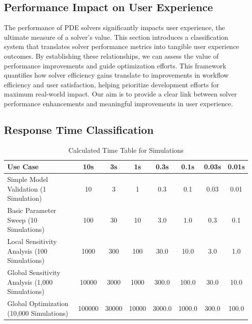 \documentclass{article}
\begin{document}
\begin{landscape}

\section{Performance Impact on User Experience}


The performance of PDE solvers significantly impacts user experience, the ultimate measure of a solver's value. This section introduces a classification system that translates solver performance metrics into tangible user experience outcomes. By establishing these relationships, we can assess the value of performance improvements and guide optimization efforts. This framework quantifies how solver efficiency gains translate to improvements in workflow efficiency and user satisfaction, helping prioritize development efforts for maximum real-world impact. Our aim is to provide a clear link between solver performance enhancements and meaningful improvements in user experience.

\subsection{Response Time Classification}

\begin{table}[h!]
    \centering
    \begin{tabular}{|l|c|c|c|c|c|c|c|}
    \hline
    \textbf{Use Case} & \textbf{10s} & \textbf{3s} & \textbf{1s} & \textbf{0.3s} & \textbf{0.1s} & \textbf{0.03s} & \textbf{0.01s} \\ \hline
    Simple Model Validation (1 Simulation) & 10 & 3 & 1 & 0.3 & 0.1 & 0.03 & 0.01 \\ \hline
    Basic Parameter Sweep (10 Simulations) & 100 & 30 & 10 & 3.0 & 1.0 & 0.3 & 0.1 \\ \hline
    Local Sensitivity Analysis (100 Simulations) & 1000 & 300 & 100 & 30.0 & 10.0 & 3.0 & 1.0 \\ \hline
    Global Sensitivity Analysis (1,000 Simulations) & 10000 & 3000 & 1000 & 300.0 & 100.0 & 30.0 & 10.0 \\ \hline
    Global Optimization (10,000 Simulations) & 100000 & 30000 & 10000 & 3000.0 & 1000.0 & 300.0 & 100.0 \\ \hline
    \end{tabular}
    \caption{Calculated Time Table for Simulations}
\end{table}


\end{landscape}
\end{document}
